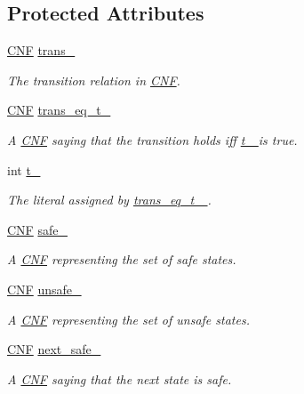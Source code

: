\subsection*{Protected Attributes}
\begin{DoxyCompactItemize}
\item 
\hyperlink{classCNF}{C\-N\-F} \hyperlink{classAIG2CNF_aedcb9a8efe69fe03721fdc17c5d11bfc}{trans\-\_\-}
\begin{DoxyCompactList}\small\item\em The transition relation in \hyperlink{classCNF}{C\-N\-F}. \end{DoxyCompactList}\item 
\hyperlink{classCNF}{C\-N\-F} \hyperlink{classAIG2CNF_af7e9b65092f626865a4aa541a48e4f1b}{trans\-\_\-eq\-\_\-t\-\_\-}
\begin{DoxyCompactList}\small\item\em A \hyperlink{classCNF}{C\-N\-F} saying that the transition holds iff \hyperlink{classAIG2CNF_af2a7f6ecdcec3b5b2f37a11b0adde65a}{t\-\_\- } is true. \end{DoxyCompactList}\item 
int \hyperlink{classAIG2CNF_af2a7f6ecdcec3b5b2f37a11b0adde65a}{t\-\_\-}
\begin{DoxyCompactList}\small\item\em The literal assigned by \hyperlink{classAIG2CNF_af7e9b65092f626865a4aa541a48e4f1b}{trans\-\_\-eq\-\_\-t\-\_\- }. \end{DoxyCompactList}\item 
\hyperlink{classCNF}{C\-N\-F} \hyperlink{classAIG2CNF_a394d2a3600bc3bec864cf08acac61437}{safe\-\_\-}
\begin{DoxyCompactList}\small\item\em A \hyperlink{classCNF}{C\-N\-F} representing the set of safe states. \end{DoxyCompactList}\item 
\hyperlink{classCNF}{C\-N\-F} \hyperlink{classAIG2CNF_afbfcf3a27261a2283a99362d2527d64f}{unsafe\-\_\-}
\begin{DoxyCompactList}\small\item\em A \hyperlink{classCNF}{C\-N\-F} representing the set of unsafe states. \end{DoxyCompactList}\item 
\hyperlink{classCNF}{C\-N\-F} \hyperlink{classAIG2CNF_a057c6a3159253267c99f115b7d724ee2}{next\-\_\-safe\-\_\-}
\begin{DoxyCompactList}\small\item\em A \hyperlink{classCNF}{C\-N\-F} saying that the next state is safe. \end{DoxyCompactList}\item 

\end{DoxyCompactItemize}

